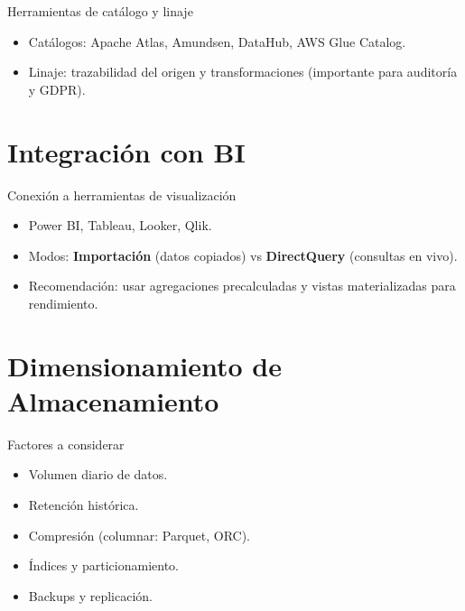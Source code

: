 \documentclass[aspectratio=169, 10pt, xcolor=table]{beamer}
\begin{document}
\begin{frame}{Herramientas de catálogo y linaje}
    \begin{itemize}
        \item Catálogos: Apache Atlas, Amundsen, DataHub, AWS Glue Catalog.
        \item Linaje: trazabilidad del origen y transformaciones (importante para auditoría y GDPR).
    \end{itemize}
\end{frame}

\section{Integración con BI}

\begin{frame}{Conexión a herramientas de visualización}
    \begin{itemize}
        \item Power BI, Tableau, Looker, Qlik.
        \item Modos: \textbf{Importación} (datos copiados) vs \textbf{DirectQuery} (consultas en vivo).
        \item Recomendación: usar agregaciones precalculadas y vistas materializadas para rendimiento.
    \end{itemize}
\end{frame}

\section{Dimensionamiento de Almacenamiento}

\begin{frame}{Factores a considerar}
    \begin{itemize}
        \item Volumen diario de datos.
        \item Retención histórica.
        \item Compresión (columnar: Parquet, ORC).
        \item Índices y particionamiento.
        \item Backups y replicación.
    \end{itemize}
\end{frame}
\end{document}
